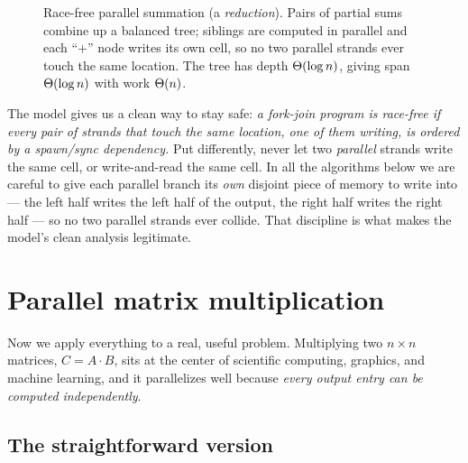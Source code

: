 \begin{figure}[h]
\centering
{}
\caption{Race-free parallel summation (a \emph{reduction}). Pairs of partial sums
combine up a balanced tree; siblings are computed in parallel and each ``$+$''
node writes its own cell, so no two parallel strands ever touch the same location.
The tree has depth $\Theta(\log n)$, giving span $\Theta(\log n)$ with work $\Theta(n)$.}
\label{ch35:reduction-tree}
\end{figure}

The model gives us a clean way to stay safe: \emph{a fork-join program is
race-free if every pair of strands that touch the same location, one of them
writing, is ordered by a spawn/sync dependency.} Put differently, never let two
\emph{parallel} strands write the same cell, or write-and-read the same cell. In
all the algorithms below we are careful to give each parallel branch its
\emph{own} disjoint piece of memory to write into --- the left half writes the
left half of the output, the right half writes the right half --- so no two
parallel strands ever collide. That discipline is what makes the model's clean
analysis legitimate.

\section{Parallel matrix multiplication}
\label{ch35:matmul}

Now we apply everything to a real, useful problem. Multiplying two $n \times n$
matrices, $C = A \cdot B$, sits at the center of scientific computing, graphics,
and machine learning, and it parallelizes well because \emph{every output
entry can be computed independently}.

\subsection{The straightforward version}

